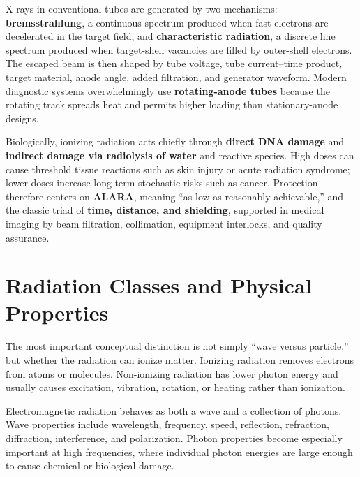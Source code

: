 \documentclass[12pt]{article}
\begin{document}
X-rays in conventional tubes are generated by two mechanisms: \textbf{bremsstrahlung}, a continuous spectrum produced when fast electrons are decelerated in the target field, and \textbf{characteristic radiation}, a discrete line spectrum produced when target-shell vacancies are filled by outer-shell electrons. The escaped beam is then shaped by tube voltage, tube current--time product, target material, anode angle, added filtration, and generator waveform. Modern diagnostic systems overwhelmingly use \textbf{rotating-anode tubes} because the rotating track spreads heat and permits higher loading than stationary-anode designs.

Biologically, ionizing radiation acts chiefly through \textbf{direct DNA damage} and \textbf{indirect damage via radiolysis of water} and reactive species. High doses can cause threshold tissue reactions such as skin injury or acute radiation syndrome; lower doses increase long-term stochastic risks such as cancer. Protection therefore centers on \textbf{ALARA}, meaning ``as low as reasonably achievable,'' and the classic triad of \textbf{time, distance, and shielding}, supported in medical imaging by beam filtration, collimation, equipment interlocks, and quality assurance.

\section{Radiation Classes and Physical Properties}

The most important conceptual distinction is not simply ``wave versus particle,'' but whether the radiation can ionize matter. Ionizing radiation removes electrons from atoms or molecules. Non-ionizing radiation has lower photon energy and usually causes excitation, vibration, rotation, or heating rather than ionization.

Electromagnetic radiation behaves as both a wave and a collection of photons. Wave properties include wavelength, frequency, speed, reflection, refraction, diffraction, interference, and polarization. Photon properties become especially important at high frequencies, where individual photon energies are large enough to cause chemical or biological damage.
\end{document}
